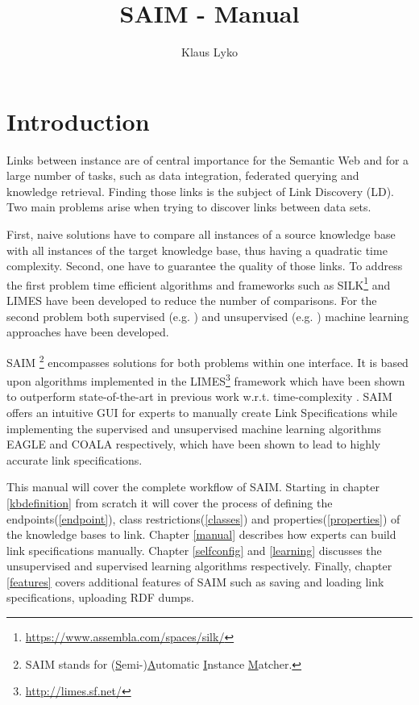 \documentclass[oneside,a4paper,12pt]{memoir}
\begin{document}
\title{SAIM - Manual}
\author{Klaus Lyko}                                                  
\maketitle

\newpage
\tableofcontents*
\chapter{Introduction}
Links between instance are of central importance for the Semantic Web and for a large number of tasks, such as data integration, federated querying and knowledge retrieval. Finding those links is the subject of Link Discovery (LD).
Two main problems arise when trying to discover links between data sets.

First, naive solutions have to compare all instances of a source knowledge base with all instances of the target knowledge base, thus having a quadratic time complexity. Second, one have to guarantee the quality of those links. 
To address the first problem time efficient algorithms and frameworks such as SILK\footnote{\url{https://www.assembla.com/spaces/silk/}} and LIMES\cite{NGAU11} have been developed to reduce the number of comparisons. For the second problem both supervised (e.g. \cite{NGLY12, NGO+13}) and unsupervised ({e.g. \cite{NIK+12}}) machine learning approaches have been developed.

SAIM \footnote{SAIM stands for (\uline{S}emi-)\uline{A}utomatic \uline{I}nstance \uline{M}atcher.}  encompasses solutions for both problems within one interface. It is based upon algorithms implemented in the LIMES\footnote{\url{http://limes.sf.net/}} framework which have been shown to outperform state-of-the-art in previous work w.r.t. time-complexity \cite{NGON12c}. SAIM offers an intuitive GUI for experts to manually create Link Specifications while implementing the supervised and unsupervised machine learning algorithms EAGLE \cite{NGLY12}	and COALA \cite{NGO+13} respectively, which have been shown to lead to highly accurate link specifications.

This manual will cover the complete workflow of SAIM. Starting in chapter \ref{kbdefinition} from scratch it will cover the process of defining the endpoints(\ref{endpoint}), class restrictions(\ref{classes}) and properties(\ref{properties}) of the knowledge bases to link. Chapter \ref{manual} describes how experts can build link specifications manually. Chapter \ref{selfconfig} and \ref{learning} discusses the unsupervised and supervised learning algorithms respectively. Finally, chapter \ref{features} covers additional features of SAIM such as saving and loading link specifications, uploading RDF dumps.
\end{document}
